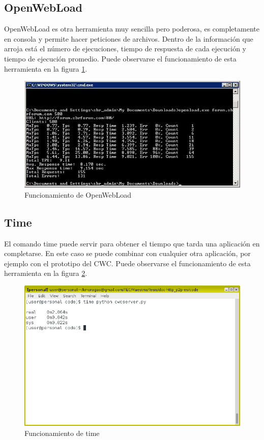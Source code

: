 \subsection{OpenWebLoad}
OpenWebLoad es otra herramienta muy sencilla pero poderosa, es completamente en consola y permite hacer peticiones de archivos. Dentro de la información que arroja está el número de ejecuciones, tiempo de respuesta de cada ejecución y tiempo de ejecución promedio. Puede observarse el funcionamiento de esta herramienta en la figura \ref{OpenWebLoad}.

\begin{figure}[h]
  \centering
    \includegraphics[scale=0.6]{gfx/OpenWebLoad}
  \caption{Funcionamiento de OpenWebLoad}
  \label{OpenWebLoad}
\end{figure}

\subsection{Time}
\label{subsec:time}
El comando time puede servir para obtener el tiempo que tarda una aplicación en completarse. En este caso se puede combinar con cualquier otra aplicación, por ejemplo con el prototipo del CWC. Puede observarse el funcionamiento de esta herramienta en la figura \ref{time}.

\begin{figure}[h]
  \centering
    \includegraphics[scale=0.6]{gfx/time}
  \caption{Funcionamiento de time}
  \label{time}
\end{figure}

